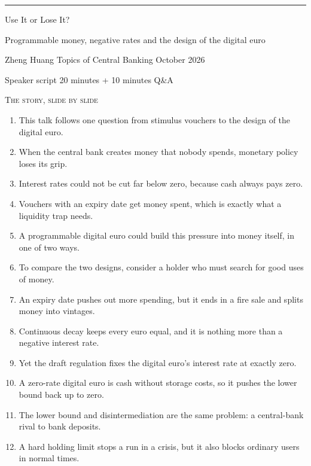 \documentclass[a4paper,10pt]{article}
\newcommand{\quiet}[1]{{\color{quiet}#1}}
\newcommand{\kicker}[1]{{\footnotesize\scshape\color{accent}#1}}
\begin{document}
{\color{accent}\rule{1.6cm}{1.2pt}}\par\medskip
{\fontsize{26}{30}\selectfont Use It or Lose It?}\par\smallskip
{\large\quiet{Programmable money, negative rates and the design of the digital euro}}\par\medskip
{\small Zheng Huang \textperiodcentered{} Topics of Central Banking \textperiodcentered{} October 2026}\par
{\footnotesize\quiet{Speaker script \textperiodcentered{} 20 minutes + 10 minutes Q\&A}}

\vspace{0.7cm}
\kicker{The story, slide by slide}\par\medskip
\small
\begin{enumerate}[leftmargin=2em,itemsep=0.25em]
  \item[\quiet{2}] This talk follows one question from stimulus vouchers to the design of the digital euro.
  \item[\quiet{3}] When the central bank creates money that nobody spends, monetary policy loses its grip.
  \item[\quiet{4}] Interest rates could not be cut far below zero, because cash always pays zero.
  \item[\quiet{5}] Vouchers with an expiry date get money spent, which is exactly what a liquidity trap needs.
  \item[\quiet{6}] A programmable digital euro could build this pressure into money itself, in one of two ways.
  \item[\quiet{7}] To compare the two designs, consider a holder who must search for good uses of money.
  \item[\quiet{8}] An expiry date pushes out more spending, but it ends in a fire sale and splits money into vintages.
  \item[\quiet{9}] Continuous decay keeps every euro equal, and it is nothing more than a negative interest rate.
  \item[\quiet{10}] Yet the draft regulation fixes the digital euro's interest rate at exactly zero.
  \item[\quiet{11}] A zero-rate digital euro is cash without storage costs, so it pushes the lower bound back up to zero.
  \item[\quiet{12}] The lower bound and disintermediation are the same problem: a central-bank rival to bank deposits.
  \item[\quiet{13}] A hard holding limit stops a run in a crisis, but it also blocks ordinary users in normal times.

\end{enumerate}
\end{document}
